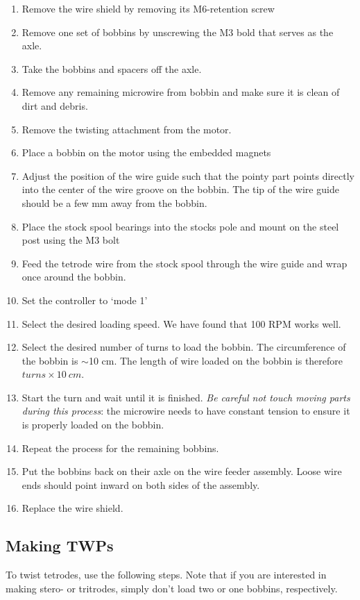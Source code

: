 \documentclass[11pt,a4paper]{article}
\begin{document}
\begin{enumerate}[noitemsep]
    \item Remove the wire shield by removing its M6-retention screw
    \item Remove one set of bobbins by unscrewing the M3 bold that serves as
        the axle.
    \item Take the bobbins and spacers off the axle.
    \item Remove any remaining microwire from bobbin and make sure it is clean
        of dirt and debris.
    \item Remove the twisting attachment from the motor.
    \item Place a bobbin on the motor using the embedded magnets
    \item Adjust the position of the wire guide such that the pointy part
        points directly into the center of the wire groove on the bobbin. The
        tip of the wire guide should be a few mm away from the bobbin.
    \item Place the stock spool bearings into the stocks pole and mount on the
        steel post using the M3 bolt
    \item Feed the tetrode wire from the stock spool through the wire guide and
        wrap once around the bobbin.
    \item Set the controller to `mode 1'
    \item Select the desired loading speed. We have found that 100 RPM works
        well.
    \item Select the desired number of turns to load the bobbin. The
        circumference of the bobbin is $\sim$10 cm. The length of wire loaded
        on the bobbin is therefore $turns \times 10\ cm$.
    \item Start the turn and wait until it is finished. \textit{Be careful not
        touch moving parts during this process}: the microwire needs to have
        constant tension to ensure it is properly loaded on the bobbin.
    \item Repeat the process for the remaining bobbins.
    \item Put the bobbins back on their axle on the wire feeder assembly. Loose
        wire ends should point inward on both sides of the assembly.
    \item Replace the wire shield.
\end{enumerate}

\subsection{Making TWPs}
To twist tetrodes, use the following steps. Note that if you are interested in
making stero- or tritrodes, simply don't load two or one bobbins, respectively.
\end{document}
